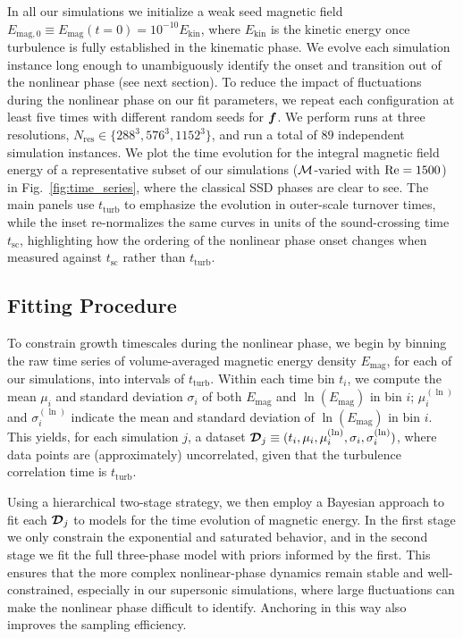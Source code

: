     In all our simulations we initialize a weak seed magnetic field $E_{\mathrm{mag}, 0} \equiv E_\mathrm{mag}(t=0) = 10^{-10} E_\mathrm{kin}$, where $E_\mathrm{kin}$ is the kinetic energy once turbulence is fully established in the kinematic phase. We evolve each simulation instance long enough to unambiguously identify the onset and transition out of the nonlinear phase (see next section). To reduce the impact of fluctuations during the nonlinear phase on our fit parameters, we repeat each configuration at least five times with different random seeds for $\bm{f}$. We perform runs at three resolutions, $N_\mathrm{res} \in \{288^3, 576^3, 1152^3\}$, and run a total of $89$ independent simulation instances. We plot the time evolution for the integral magnetic field energy of a representative subset of our simulations ($\mathcal{M}$-varied with $\mathrm{Re} = 1500$) in Fig.~\ref{fig:time_series}, where the classical SSD phases are clear to see. The main panels use $t_\mathrm{turb}$ to emphasize the evolution in outer-scale turnover times, while the inset re-normalizes the same curves in units of the sound-crossing time $t_\mathrm{sc}$, highlighting how the ordering of the nonlinear phase onset changes when measured against $t_\mathrm{sc}$ rather than $t_\mathrm{turb}$.

\subsection{Fitting Procedure} \label{sec:methods:fitting}

    To constrain growth timescales during the nonlinear phase, we begin by binning the raw time series of volume-averaged magnetic energy density $E_\mathrm{mag}$, for each of our simulations, into intervals of $t_\mathrm{turb}$. Within each time bin $t_i$, we compute the mean $\mu_i$ and standard deviation $\sigma_i$ of both $E_\mathrm{mag}$ and $\ln(E_\mathrm{mag})$ in bin $i$; $\mu_i^{(\ln)}$ and $\sigma_i^{(\ln)}$ indicate the mean and standard deviation of $\ln(E_\mathrm{mag})$ in bin $i$. This yields, for each simulation $j$, a dataset $\bm{\mathcal{D}}_j \equiv (t_i, \mu_i, \mu_i^{(\ln)}, \sigma_{i}, \sigma_i^{(\ln)})$, where data points are (approximately) uncorrelated, given that the turbulence correlation time is $t_\mathrm{turb}$.

    Using a hierarchical two-stage strategy, we then employ a Bayesian approach to fit each $\bm{\mathcal{D}}_j$ to models for the time evolution of magnetic energy. In the first stage we only constrain the exponential and saturated behavior, and in the second stage we fit the full three-phase model with priors informed by the first. This ensures that the more complex nonlinear-phase dynamics remain stable and well-constrained, especially in our supersonic simulations, where large fluctuations can make the nonlinear phase difficult to identify. Anchoring in this way also improves the sampling efficiency.

